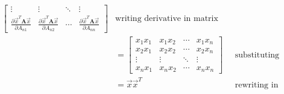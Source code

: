 \documentclass[11pt]{article}
\newcommand{\pd}[2]{\frac{\partial #1}{\partial #2}}
\begin{document}
\begin{enumerate}
\begin{align*}
\begin{bmatrix}
            \vdots & \vdots & \ddots & \vdots \\
            \pd{\vec{x}^T \textbf{A} \vec{x}}{A_{n1}} & \pd{\vec{x}^T \textbf{A} \vec{x}}{A_{n2}} & \cdots & \pd{\vec{x}^T \textbf{A} \vec{x}}{A_{nn}}
        \end{bmatrix} & \text{writing derivative in matrix form} \\
        &= \begin{bmatrix}
            x_1 x_1 & x_1 x_2 & \cdots & x_1 x_n \\
            x_2 x_1 & x_2 x_2 & \cdots & x_2 x_n \\
            \vdots & \vdots & \ddots & \vdots \\
            x_n x_1 & x_n x_2 & \cdots & x_n x_n
        \end{bmatrix} & \text{substituting previous result} \\
        &= \vec{x} \vec{x}^T & \text{rewriting in vector form} \\
    \end{align*}
\end{enumerate}

\newpage
\end{document}

